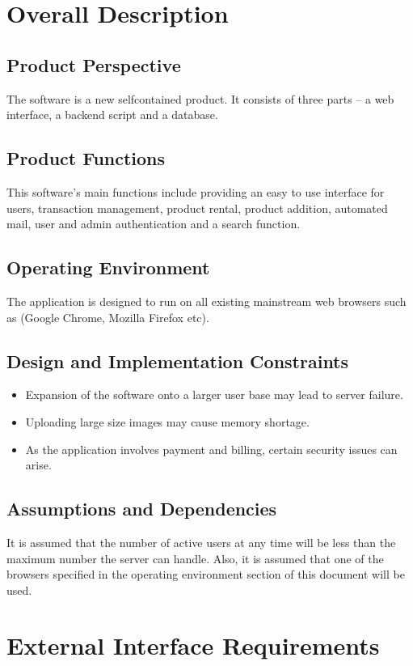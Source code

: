 \documentclass[11pt]{report}
\begin{document}
\section{Overall Description}
\subsection{Product Perspective}
The software is a new self­contained product. It consists of three parts – a web interface, a back­end script 
and a database. 

\subsection{Product Functions}
This software's main functions include providing an easy to use interface for users, transaction management, 
product rental, product addition, automated mail, user and admin authentication and a search function.
\subsection{Operating Environment}
The application is designed to run on all existing mainstream web browsers such as (Google Chrome, 
Mozilla Firefox etc).
\subsection{Design and Implementation Constraints}
\begin{itemize}
  \item Expansion of the software onto a larger user base may lead to server failure.
  \item Uploading large size images may cause memory shortage.
  \item As the application involves payment and billing, certain security issues can arise.
\end{itemize}

\subsection{Assumptions and Dependencies}
It is assumed that the number of active users at any time will be less than the maximum number the server 
can handle. Also, it is assumed that one of the browsers specified in the operating environment section of 
this document will be used.
\section{External Interface Requirements}
\end{document}
